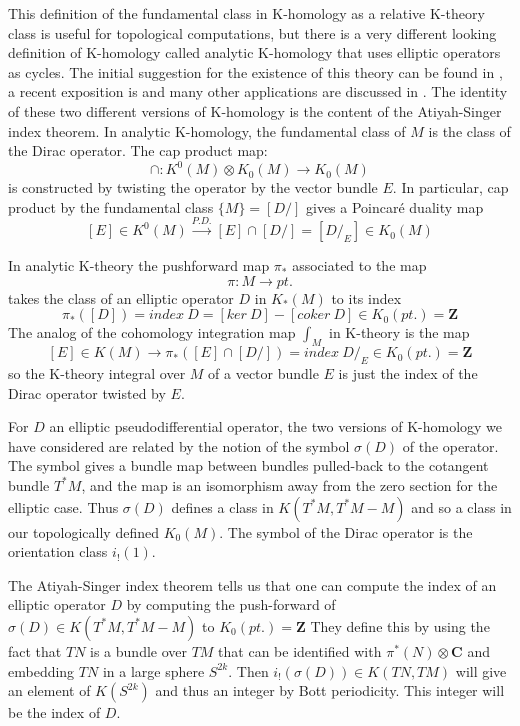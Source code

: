 \documentclass[a4paper,a4paper]{article}
\theoremstyle{conjecture}
\def\Slash#1{#1\!\!\!\!/}
\def\Dirac{\Slash D}
\begin{document}
This definition of the fundamental class in K-homology as a relative K-theory class is useful
for topological computations, but there is a very different looking
definition of K-homology called analytic K-homology that uses elliptic operators as cycles. 
The initial suggestion for the existence of this theory can be found in \cite{Atiyah1}, a recent
exposition is \cite{Higson-Roe} and many other applications are discussed in \cite{Connes}.
The identity
of these two different versions of K-homology is the content of the Atiyah-Singer
index theorem.  In analytic K-homology, the fundamental class of $M$
is the class of the Dirac operator.  The cap product map:
$$\cap :K^0(M)\otimes K_0(M) \rightarrow K_0(M)$$
is constructed by twisting the operator by the vector bundle $E$.  In particular,
cap product by the fundamental class $\{M\}=[\Dirac]$ gives a Poincar\'e duality map
$$[E]\in K^0(M)\stackrel{P.D.}\longrightarrow [E]\cap [\Dirac] =[\Dirac _E]\in K_0(M)$$

In analytic K-theory the pushforward map $\pi_*$ associated to the map
$$\pi: M \rightarrow pt.$$
takes the class of an elliptic operator $D$ in $K_*(M)$ to its index
$$\pi_*([D])=index\ D=[ker\ D] - [coker\ D]\in K_0(pt.)= \mathbf Z$$
The analog of the cohomology integration map $\int_M$ in K-theory is
the map
$$ [E]\in K(M)\rightarrow \pi_*([E]\cap [\Dirac]) =index\ \Dirac _E \in K_0(pt.)=\mathbf Z$$
so the K-theory integral over $M$ of a vector bundle $E$ is just the index of the Dirac
operator twisted by $E$.

For $D$ an elliptic pseudodifferential operator, the two versions of 
K-homology we have considered are related by the notion of the symbol
$\sigma (D)$ of the operator.  The symbol gives a bundle map between
bundles pulled-back to the cotangent bundle $T^*M$, and the map is
an isomorphism away from the zero section for the elliptic case. Thus
$\sigma (D)$ defines a class in $K(T^*M, T^*M-M)$ and so a class in our
topologically defined $K_0(M)$.  The symbol of the Dirac operator is the 
orientation class $i_!(1)$.  

The Atiyah-Singer index theorem tells us that one can compute the index of
an elliptic operator $D$ by computing the push-forward of 
$\sigma (D)\in K(T^*M, T^*M-M)$ to $K_0(pt.)=\mathbf Z$
They define this by using the fact that $TN$ is a bundle over $TM$ that
can be identified with $\pi^*(N)\otimes \mathbf C$ and embedding $TN$
in a large sphere $S^{2k}$. Then 
$i_!(\sigma (D))\in K(TN,TM)$ will give an element of $K(S^{2k})$ and thus
an integer by Bott periodicity. This integer will be the index of $D$.
\end{document}
